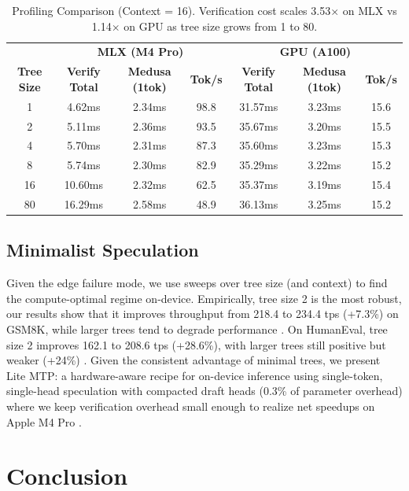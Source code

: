 \documentclass{article} %
\begin{document}
\begin{table}[H]
\caption{Profiling Comparison (Context = 16). Verification cost scales 3.53$\times$ on MLX vs 1.14$\times$ on GPU as tree size grows from 1 to 80.}
\label{tab:profiling}
\centering
\small
\begin{tabular}{c|ccc|ccc}
\toprule
& \multicolumn{3}{c|}{\textbf{MLX (M4 Pro)}} & \multicolumn{3}{c}{\textbf{GPU (A100)}} \\
\textbf{Tree Size} & \textbf{Verify Total} & \textbf{Medusa (1tok)} & \textbf{Tok/s} & \textbf{Verify Total} & \textbf{Medusa (1tok)} & \textbf{Tok/s} \\
\midrule
1 & 4.62ms & 2.34ms & 98.8 & 31.57ms & 3.23ms & 15.6 \\
2 & 5.11ms & 2.36ms & 93.5 & 35.67ms & 3.20ms & 15.5 \\
4 & 5.70ms & 2.31ms & 87.3 & 35.60ms & 3.23ms & 15.3 \\
8 & 5.74ms & 2.30ms & 82.9 & 35.29ms & 3.22ms & 15.2 \\
16 & 10.60ms & 2.32ms & 62.5 & 35.37ms & 3.19ms & 15.4 \\
80 & 16.29ms & 2.58ms & 48.9 & 36.13ms & 3.25ms & 15.2 \\
\bottomrule
\end{tabular}
\end{table}

\subsection{Minimalist Speculation}

Given the edge failure mode, we use sweeps over tree size (and context) to find the compute-optimal regime on-device. Empirically, tree size 2 is the most robust, our results show that it improves throughput from 218.4 to 234.4 tps (+7.3\%) on GSM8K, while larger trees tend to degrade performance \citep{cobbe2021gsm8k}. On HumanEval, tree size 2 improves 162.1 to 208.6 tps (+28.6\%), with larger trees still positive but weaker (+24\%) \citep{chen2021humaneval}. Given the consistent advantage of minimal trees, we present Lite MTP: a hardware-aware recipe for on-device inference using single-token, single-head speculation with compacted draft heads (0.3\% of parameter overhead) where we keep verification overhead small enough to realize net speedups on Apple M4 Pro \citep{apple2024m4}.

\section{Conclusion}
\end{document}

